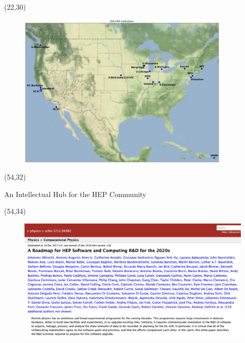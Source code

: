 \documentclass[final]{beamer}
\begin{document}
\begin{frame}{}
\begin{textblock}{32.0}(22,30)
\begin{figure}[tbph]
\centering
\includegraphics[width=0.90\textwidth]{images/iris-hep-map-V1.png}
\end{figure}
\end{textblock}

\begin{textblock}{28.0}(54,32)
\begin{block}{An Intellectual Hub for the HEP Community}
\begin{textblock}{26.0}(54,34)
\begin{figure}[tbph]
\centering
\includegraphics[width=1.07\textwidth]{images/20230925-arxiv-roadmap.png}
\end{figure}
\end{textblock}
\end{block}
\end{textblock}





\end{frame}
\end{document}
